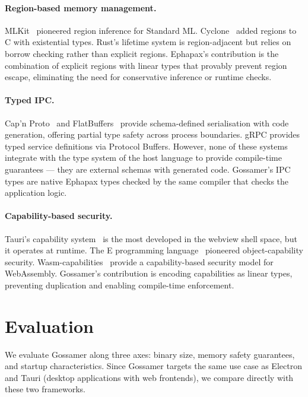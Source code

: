\documentclass[11pt,a4paper]{article}
\theoremstyle{definition}
\begin{document}
\paragraph{Region-based memory management.}
MLKit~\cite{tofte1997} pioneered region inference for Standard ML.
Cyclone~\cite{jim2002cyclone} added regions to C with existential types.
Rust's lifetime system is region-adjacent but relies on borrow checking
rather than explicit regions. Ephapax's contribution is the combination
of explicit regions with linear types that provably prevent region
escape, eliminating the need for conservative inference or runtime
checks.

\paragraph{Typed IPC.}
Cap'n Proto~\cite{capnproto} and FlatBuffers~\cite{flatbuffers}
provide schema-defined serialisation with code generation, offering
partial type safety across process boundaries. gRPC provides typed
service definitions via Protocol Buffers. However, none of these
systems integrate with the type system of the host language to provide
compile-time guarantees --- they are external schemas with generated
code. Gossamer's IPC types are native Ephapax types checked by the
same compiler that checks the application logic.

\paragraph{Capability-based security.}
Tauri's capability system~\cite{tauri2024} is the most developed in the
webview shell space, but it operates at runtime. The E programming
language~\cite{miller2006} pioneered object-capability security.
Wasm-capabilities~\cite{wasi} provide a capability-based security model
for WebAssembly. Gossamer's contribution is encoding capabilities as
linear types, preventing duplication and enabling compile-time
enforcement.

\section{Evaluation}
\label{sec:evaluation}

We evaluate Gossamer along three axes: binary size, memory safety
guarantees, and startup characteristics. Since Gossamer targets
the same use case as Electron and Tauri (desktop applications with
web frontends), we compare directly with these two frameworks.
\end{document}
